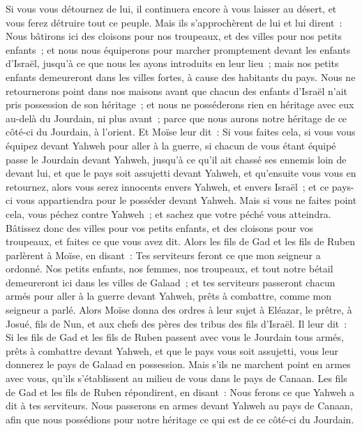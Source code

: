 \begin{multicols}{2}
Si vous vous détournez de lui, il continuera encore à vous laisser au désert, et vous ferez détruire tout ce peuple.
Mais ils s'approchèrent de lui et lui dirent~: Nous bâtirons ici des cloisons pour nos troupeaux, et des villes pour nos petits enfants~;
et nous nous équiperons pour marcher promptement devant les enfants d'Israël, jusqu'à ce que nous les ayons introduits en leur lieu~; mais nos petits enfants demeureront dans les villes fortes, à cause des habitants du pays.
Nous ne retournerons point dans nos maisons avant que chacun des enfants d'Israël n'ait pris possession de son héritage~;
et nous ne posséderons rien en héritage avec eux au-delà du Jourdain, ni plus avant~; parce que nous aurons notre héritage de ce côté-ci du Jourdain, à l'orient.
Et Moïse leur dit~: Si vous faites cela, si vous vous équipez devant Yahweh pour aller à la guerre,
si chacun de vous étant équipé passe le Jourdain devant Yahweh, jusqu'à ce qu'il ait chassé ses ennemis loin de devant lui,
et que le pays soit assujetti devant Yahweh, et qu'ensuite vous vous en retournez, alors vous serez innocents envers Yahweh, et envers Israël~; et ce pays-ci vous appartiendra pour le posséder devant Yahweh.
Mais si vous ne faites point cela, vous péchez contre Yahweh~; et sachez que votre péché vous atteindra.
Bâtissez donc des villes pour vos petits enfants, et des cloisons pour vos troupeaux, et faites ce que vous avez dit.
Alors les fils de Gad et les fils de Ruben parlèrent à Moïse, en disant~: Tes serviteurs feront ce que mon seigneur a ordonné.
Nos petits enfants, nos femmes, nos troupeaux, et tout notre bétail demeureront ici dans les villes de Galaad~;
et tes serviteurs passeront chacun armés pour aller à la guerre devant Yahweh, prêts à combattre, comme mon seigneur a parlé.
Alors Moïse donna des ordres à leur sujet à Eléazar, le prêtre, à Josué, fils de Nun, et aux chefs des pères des tribus des fils d'Israël.
Il leur dit~: Si les fils de Gad et les fils de Ruben passent avec vous le Jourdain tous armés, prêts à combattre devant Yahweh, et que le pays vous soit assujetti, vous leur donnerez le pays de Galaad en possession.
Mais s'ils ne marchent point en armes avec vous, qu'ils s'établissent au milieu de vous dans le pays de Canaan.
Les fils de Gad et les fils de Ruben répondirent, en disant~: Nous ferons ce que Yahweh a dit à tes serviteurs.
Nous passerons en armes devant Yahweh au pays de Canaan, afin que nous possédions pour notre héritage ce qui est de ce côté-ci du Jourdain.

\end{multicols}
